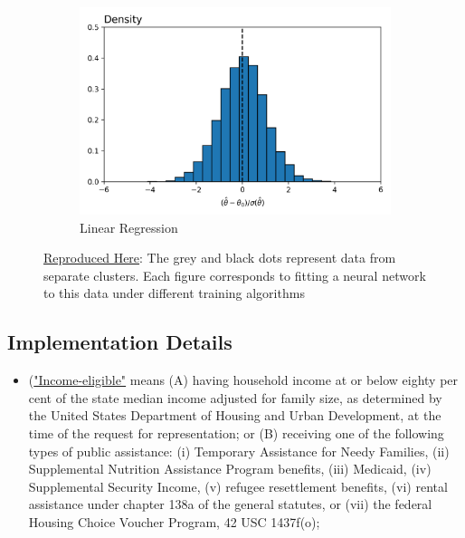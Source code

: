 \documentclass[a4paper,12pt]{article}
\begin{document}
\begin{figure}[htbp]
\begin{subfigure}{.32\textwidth}
    \includegraphics[width=.95\linewidth]{figures/framework/dml_linear_comp.png}
        \caption{Linear Regression}
    \label{fig:rfp}
\end{subfigure}
\caption{ \href{https://github.com/pharringtonp19/rfp/blob/main/notebooks/grad_desc_toy.ipynb}{Reproduced Here}: The grey and black dots represent data from separate clusters. Each figure corresponds to fitting a neural network to this data under different training algorithms}
\label{fig:mamlablation}
\end{figure}

\subsection{Implementation Details}
\begin{itemize}
    \item (\href{https://www.cga.ct.gov/2021/ACT/PA/PDF/2021PA-00034-R00HB-06531-PA.PDF}{"Income-eligible"} means (A) having household income at or below
eighty per cent of the state median income adjusted for family size, as
determined by the United States Department of Housing and Urban
Development, at the time of the request for representation; or (B)
receiving one of the following types of public assistance: (i) Temporary
Assistance for Needy Families, (ii) Supplemental Nutrition Assistance
Program benefits, (iii) Medicaid, (iv) Supplemental Security Income, (v)
refugee resettlement benefits, (vi) rental assistance under chapter 138a
of the general statutes, or (vii) the federal Housing Choice Voucher
Program, 42 USC 1437f(o);
\end{itemize}
\end{document}
